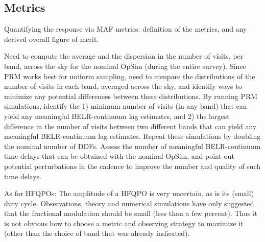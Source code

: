 

\subsection{Metrics}
\label{sec:\secname:metrics}

Quantifying the response via MAF metrics: definition of the metrics,
and any derived overall figure of merit.



Need to compute the average and the dispersion in the
number of visits, per band, across the sky for the nominal OpSim
(during the entire survey). Since PRM works best for uniform sampling,
need to compare the distributions of the number of visits in each
band, averaged across the sky, and identify ways to minimize any
potential differences between these distributions. By running PRM
simulations, identify the 1) minimum number of visits (in any band)
that can yield any meaningful BELR-continuum lag estimates, and 2) the
largest difference in the number of visits between two different bands
that can yield any meaningful BELR-continuum lag estimates. Repeat
these simulations by doubling the nominal number of DDFs. Assess the
number of meaningful BELR-continuum time delays that can be obtained
with the nominal OpSim, and point out potential perturbations in the
cadence to improve the number and quality of such time delays.


As for HFQPOs: The amplitude of a HFQPO is very uncertain, as is its
(small) duty cycle. Observations, theory and numerical simulations have
only suggested that the fractional modulation should be small (less than
a few percent). Thus it is not obvious how to choose a metric and observing
strategy to maximize it (other than the choice of band that was already
indicated).


